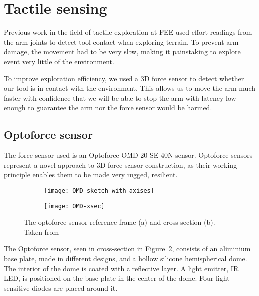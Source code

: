 \documentclass[buriama8_dp.tex]{subfiles}
\begin{document}
\section{Tactile sensing}

Previous work in the field of tactile exploration at FEE \cite{vojta} used effort readings from the arm joints to detect tool contact when exploring terrain. To prevent arm damage, the movement had to be very slow, making it painstaking to explore event very little of the environment.

To improve exploration efficiency, we used a 3D force sensor to detect whether our tool is in contact with the environment. This allows us to move the arm much faster with confidence that we will be able to stop the arm with latency low enough to guarantee the arm nor the force sensor would be harmed.

\subsection{Optoforce sensor}
\label{subsec:opto}

The force sensor used is an Optoforce OMD-20-SE-40N sensor. Optoforce sensors represent a novel approach to 3D force sensor construction, as their working principle enables them to be made very rugged, resilient.

\begin{figure}[ht]
  \begin{subfigure}[t]{0.4\textwidth}
    \texttt{[image: OMD-sketch-with-axises]}
    \caption{}
    \label{fig:omd_geom}
  \end{subfigure}
  \begin{subfigure}[t]{0.4\textwidth}
    \texttt{[image: OMD-xsec]}
    \caption{}
    \label{fig:omd_xsec}
  \end{subfigure}

  \caption[Optoforce sensor]{The optoforce sensor reference frame (a) and cross-section (b). Taken from \cite{opto_whitep}}
  \label{fig:decomps}
\end{figure}

The Optoforce sensor, seen in cross-section in Figure~\ref{fig:omd_xsec}, consists of an aliminium base plate, made in different designs, and a hollow silicone hemispherical dome. The interior of the dome is coated with a reflective layer. A light emitter, IR LED, is positioned on the base plate in the center of the dome. Four light-sensitive diodes are placed around it.
\end{document}
